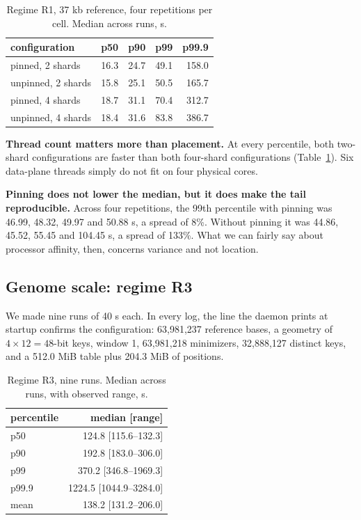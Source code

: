 \documentclass[conference]{IEEEtran}
\begin{document}
\begin{table}[t]
\caption{Regime R1, 37 kb reference, four repetitions per cell. Median across runs, \textmu{}s.}
\label{tab:r1}
\centering
\footnotesize
\begin{tabular}{lrrrr}
\toprule
configuration & p50 & p90 & p99 & p99.9 \\
\midrule
pinned, 2 shards   & 16.3 & 24.7 & 49.1 & 158.0 \\
unpinned, 2 shards & 15.8 & 25.1 & 50.5 & 165.7 \\
pinned, 4 shards   & 18.7 & 31.1 & 70.4 & 312.7 \\
unpinned, 4 shards & 18.4 & 31.6 & 83.8 & 386.7 \\
\bottomrule
\end{tabular}
\end{table}

\textbf{Thread count matters more than placement.} At every percentile, both two-shard
configurations are faster than both four-shard configurations (Table~\ref{tab:r1}). Six
data-plane threads simply do not fit on four physical cores.

\textbf{Pinning does not lower the median, but it does make the tail reproducible.} Across four
repetitions, the 99th percentile with pinning was 46.99, 48.32, 49.97 and 50.88 \textmu{}s, a
spread of 8\%. Without pinning it was 44.86, 45.52, 55.45 and 104.45 \textmu{}s, a spread of
133\%. What we can fairly say about processor affinity, then, concerns variance and not
location.

\subsection{Genome scale: regime R3}

We made nine runs of 40 s each. In every log, the line the daemon prints at startup confirms the
configuration: 63,981,237 reference bases, a geometry of $4 \times 12 = 48$-bit keys, window 1,
63,981,218 minimizers, 32,888,127 distinct keys, and a 512.0 MiB table plus 204.3 MiB of
positions.

\begin{table}[t]
\caption{Regime R3, nine runs. Median across runs, with observed range, \textmu{}s.}
\label{tab:r3}
\centering
\footnotesize
\begin{tabular}{lr}
\toprule
percentile & median [range] \\
\midrule
p50   & 124.8 [115.6--132.3] \\
p90   & 192.8 [183.0--306.0] \\
p99   & 370.2 [346.8--1969.3] \\
p99.9 & 1224.5 [1044.9--3284.0] \\
mean  & 138.2 [131.2--206.0] \\
\bottomrule
\end{tabular}
\end{table}
\end{document}
